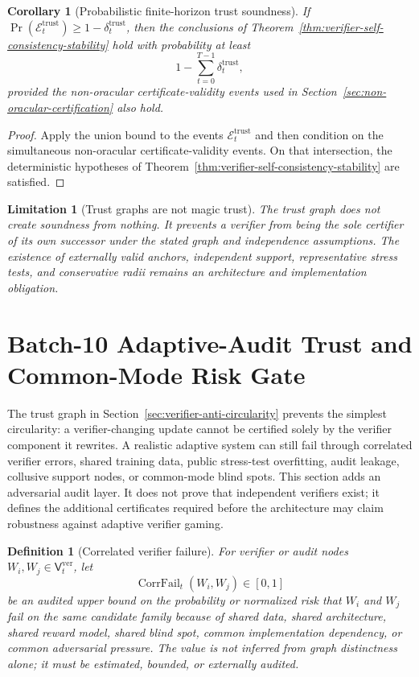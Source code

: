 \documentclass[11pt,a4paper]{article}
\newtheorem{corollary}[theorem]{Corollary}
\newtheorem{definition}[theorem]{Definition}
\newtheorem{limitation}[theorem]{Limitation}
\newcommand{\Ecal}{\mathcal E}
\newcommand{\ver}{\mathrm{ver}}
\newcommand{\trust}{\mathrm{trust}}
\newcommand{\CorrFail}{\operatorname{CorrFail}}
\begin{document}
\begin{corollary}[Probabilistic finite-horizon trust soundness]
\label{cor:finite-horizon-trust-soundness}
If \(\Pr(\Ecal_t^{\trust})\ge1-\delta_t^{\trust}\), then the conclusions of Theorem~\ref{thm:verifier-self-consistency-stability} hold with probability at least
\[
1-
\sum_{t=0}^{T-1}\delta_t^{\trust},
\]
provided the non-oracular certificate-validity events used in Section~\ref{sec:non-oracular-certification} also hold.
\end{corollary}

\begin{proof}
Apply the union bound to the events \(\Ecal_t^{\trust}\) and then condition on the simultaneous non-oracular certificate-validity events.  On that intersection, the deterministic hypotheses of Theorem~\ref{thm:verifier-self-consistency-stability} are satisfied.
\end{proof}

\begin{limitation}[Trust graphs are not magic trust]
The trust graph does not create soundness from nothing.  It prevents a verifier from being the sole certifier of its own successor under the stated graph and independence assumptions.  The existence of externally valid anchors, independent support, representative stress tests, and conservative radii remains an architecture and implementation obligation.
\end{limitation}



\section{Batch-10 Adaptive-Audit Trust and Common-Mode Risk Gate}
\label{sec:batch10-adaptive-audit-trust}

The trust graph in Section~\ref{sec:verifier-anti-circularity} prevents the simplest circularity: a verifier-changing update cannot be certified solely by the verifier component it rewrites.  A realistic adaptive system can still fail through correlated verifier errors, shared training data, public stress-test overfitting, audit leakage, collusive support nodes, or common-mode blind spots.  This section adds an adversarial audit layer.  It does not prove that independent verifiers exist; it defines the additional certificates required before the architecture may claim robustness against adaptive verifier gaming.

\begin{definition}[Correlated verifier failure]
\label{def:corrfail-rclm}
For verifier or audit nodes \(W_i,W_j\in\mathsf V_t^{\ver}\), let
\[
\CorrFail_t(W_i,W_j)\in[0,1]
\]
be an audited upper bound on the probability or normalized risk that \(W_i\) and \(W_j\) fail on the same candidate family because of shared data, shared architecture, shared reward model, shared blind spot, common implementation dependency, or common adversarial pressure.  The value is not inferred from graph distinctness alone; it must be estimated, bounded, or externally audited.
\end{definition}
\end{document}
